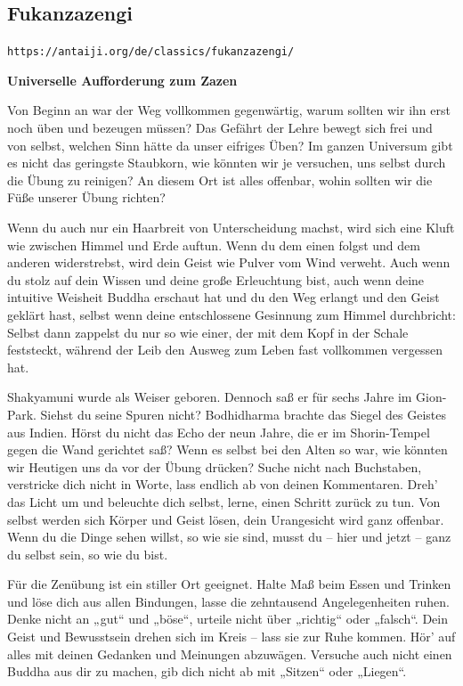 \documentclass[10pt,a4paper]{article}
\begin{document}
\newpage
\subsection{Fukanzazengi}

\verb+https://antaiji.org/de/classics/fukanzazengi/+

\vskip 4pt
{\bf Universelle Aufforderung zum Zazen}

\vskip 4pt
Von Beginn an war der Weg vollkommen gegenwärtig, warum sollten wir ihn erst noch üben und bezeugen
müssen? Das Gefährt der Lehre bewegt sich frei und von selbst, welchen Sinn hätte da unser eifriges Üben? Im
ganzen Universum gibt es nicht das geringste Staubkorn, wie könnten wir je versuchen, uns selbst durch die
Übung zu reinigen? An diesem Ort ist alles offenbar, wohin sollten wir die Füße unserer Übung richten?

\vskip 4pt
Wenn du auch nur ein Haarbreit von Unterscheidung machst, wird sich eine Kluft wie zwischen Himmel und Erde
auftun. Wenn du dem einen folgst und dem anderen widerstrebst, wird dein Geist wie Pulver vom Wind verweht.
Auch wenn du stolz auf dein Wissen und deine große Erleuchtung bist, auch wenn deine intuitive Weisheit Buddha
erschaut hat und du den Weg erlangt und den Geist geklärt hast, selbst wenn deine entschlossene Gesinnung zum
Himmel durchbricht: Selbst dann zappelst du nur so wie einer, der mit dem Kopf in der Schale feststeckt, während
der Leib den Ausweg zum Leben fast vollkommen vergessen hat.

\vskip 4pt
Shakyamuni wurde als Weiser geboren. Dennoch saß er für sechs Jahre im Gion-Park. Siehst du seine Spuren
nicht? Bodhidharma brachte das Siegel des Geistes aus Indien. Hörst du nicht das Echo der neun Jahre, die er im
Shorin-Tempel gegen die Wand gerichtet saß? Wenn es selbst bei den Alten so war, wie könnten wir Heutigen uns
da vor der Übung drücken? Suche nicht nach Buchstaben, verstricke dich nicht in Worte, lass endlich ab von
deinen Kommentaren. Dreh’ das Licht um und beleuchte dich selbst, lerne, einen Schritt zurück zu tun. Von selbst
werden sich Körper und Geist lösen, dein Urangesicht wird ganz offenbar. Wenn du die Dinge sehen willst, so wie
sie sind, musst du – hier und jetzt – ganz du selbst sein, so wie du bist.

\vskip 4pt
Für die Zenübung ist ein stiller Ort geeignet. Halte Maß beim Essen und Trinken und löse dich aus allen
Bindungen, lasse die zehntausend Angelegenheiten ruhen. Denke nicht an „gut“ und „böse“, urteile nicht über
„richtig“ oder „falsch“. Dein Geist und Bewusstsein drehen sich im Kreis – lass sie zur Ruhe kommen. Hör’ auf alles
mit deinen Gedanken und Meinungen abzuwägen. Versuche auch nicht einen Buddha aus dir zu machen, gib dich
nicht ab mit „Sitzen“ oder „Liegen“.
\end{document}
